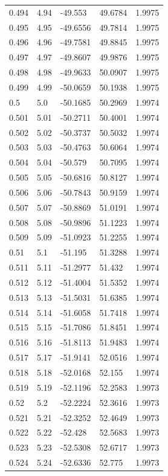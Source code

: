 \begin{tabular}{lllll}
0.494 & 4.94 & -49.553 & 49.6784 & 1.9975 \\
0.495 & 4.95 & -49.6556 & 49.7814 & 1.9975 \\
0.496 & 4.96 & -49.7581 & 49.8845 & 1.9975 \\
0.497 & 4.97 & -49.8607 & 49.9876 & 1.9975 \\
0.498 & 4.98 & -49.9633 & 50.0907 & 1.9975 \\
0.499 & 4.99 & -50.0659 & 50.1938 & 1.9975 \\
0.5 & 5.0 & -50.1685 & 50.2969 & 1.9974 \\
0.501 & 5.01 & -50.2711 & 50.4001 & 1.9974 \\
0.502 & 5.02 & -50.3737 & 50.5032 & 1.9974 \\
0.503 & 5.03 & -50.4763 & 50.6064 & 1.9974 \\
0.504 & 5.04 & -50.579 & 50.7095 & 1.9974 \\
0.505 & 5.05 & -50.6816 & 50.8127 & 1.9974 \\
0.506 & 5.06 & -50.7843 & 50.9159 & 1.9974 \\
0.507 & 5.07 & -50.8869 & 51.0191 & 1.9974 \\
0.508 & 5.08 & -50.9896 & 51.1223 & 1.9974 \\
0.509 & 5.09 & -51.0923 & 51.2255 & 1.9974 \\
0.51 & 5.1 & -51.195 & 51.3288 & 1.9974 \\
0.511 & 5.11 & -51.2977 & 51.432 & 1.9974 \\
0.512 & 5.12 & -51.4004 & 51.5352 & 1.9974 \\
0.513 & 5.13 & -51.5031 & 51.6385 & 1.9974 \\
0.514 & 5.14 & -51.6058 & 51.7418 & 1.9974 \\
0.515 & 5.15 & -51.7086 & 51.8451 & 1.9974 \\
0.516 & 5.16 & -51.8113 & 51.9483 & 1.9974 \\
0.517 & 5.17 & -51.9141 & 52.0516 & 1.9974 \\
0.518 & 5.18 & -52.0168 & 52.155 & 1.9974 \\
0.519 & 5.19 & -52.1196 & 52.2583 & 1.9973 \\
0.52 & 5.2 & -52.2224 & 52.3616 & 1.9973 \\
0.521 & 5.21 & -52.3252 & 52.4649 & 1.9973 \\
0.522 & 5.22 & -52.428 & 52.5683 & 1.9973 \\
0.523 & 5.23 & -52.5308 & 52.6717 & 1.9973 \\
0.524 & 5.24 & -52.6336 & 52.775 & 1.9973 \\

\end{tabular}
